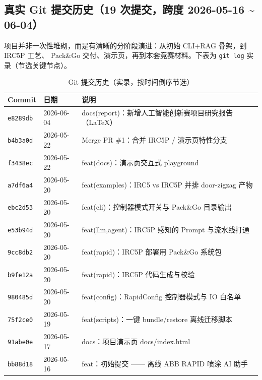 \documentclass[11pt,a4paper,fontset=none]{ctexart}
\begin{document}
\subsection{真实 Git 提交历史（19 次提交，跨度 2026-05-16 \textasciitilde{} 06-04）}
项目并非一次性堆砌，而是有清晰的分阶段演进：从初始 CLI+RAG 骨架，到 IRC5P 工艺、
Pack\&Go 交付、演示页，再到本套竞赛材料。下表为 \texttt{git log} 实录（节选关键节点）。

\begin{table}[h]
\centering
\caption{Git 提交历史（实录，按时间倒序节选）}
\small
\begin{tabularx}{\textwidth}{@{}l l X@{}}
\toprule
\textbf{Commit} & \textbf{日期} & \textbf{说明} \\
\midrule
\texttt{e8289db} & 2026-06-04 & docs(report)：新增人工智能创新赛项目研究报告（LaTeX）\\
\texttt{b4b3a0d} & 2026-05-22 & Merge PR \#1：合并 IRC5P / 演示页特性分支 \\
\texttt{f3438ec} & 2026-05-22 & feat(docs)：演示页交互式 playground \\
\texttt{a7df6a4} & 2026-05-20 & feat(examples)：IRC5 vs IRC5P 并排 door-zigzag 产物 \\
\texttt{ebc2d53} & 2026-05-20 & feat(cli)：控制器模式开关与 Pack\&Go 目录输出 \\
\texttt{e53b94d} & 2026-05-20 & feat(llm,agent)：IRC5P 感知的 Prompt 与流水线打通 \\
\texttt{9cc8db2} & 2026-05-20 & feat(rapid)：IRC5P 部署用 Pack\&Go 系统包 \\
\texttt{b9fe12a} & 2026-05-20 & feat(rapid)：IRC5P 代码生成与校验 \\
\texttt{980485d} & 2026-05-20 & feat(config)：RapidConfig 控制器模式与 IO 白名单 \\
\texttt{75f2ce0} & 2026-05-19 & feat(scripts)：一键 bundle/restore 离线迁移脚本 \\
\texttt{91abe0e} & 2026-05-17 & docs：项目演示页 docs/index.html \\
\texttt{bb88d18} & 2026-05-16 & feat：初始提交 —— 离线 ABB RAPID 喷涂 AI 助手 \\
\bottomrule
\end{tabularx}
\end{table}
\end{document}
